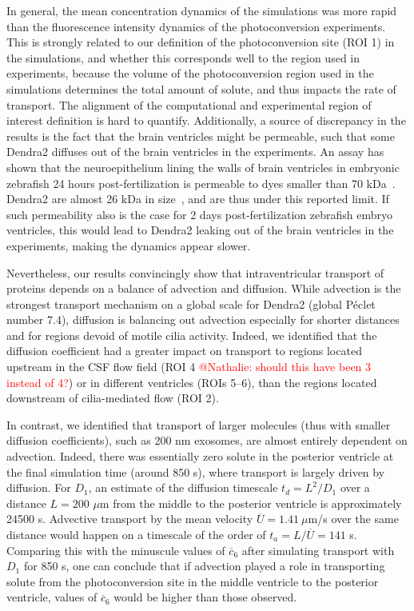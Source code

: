 \documentclass[fleqn]{wlscirep}
\newcommand{\cbar}{\overline{c}}
\newcommand{\fixme}[1]{\textcolor{red}{#1}}
\begin{document}
In general, the mean concentration dynamics of the simulations was 
more rapid than the fluorescence intensity dynamics of the photoconversion experiments.
This is strongly related to our definition of the photoconversion site
(ROI 1) in the simulations, and whether this corresponds well to the
region used in experiments, because the volume of the photoconversion
region used in the simulations determines the total amount of solute,
and thus impacts the rate of transport. The alignment of the computational
and experimental region of interest definition is hard to quantify.
Additionally, a source of discrepancy in the results is the fact that the
brain ventricles might be permeable, such that some Dendra2 diffuses out
of the brain ventricles in the experiments. An assay has shown that the neuroepithelium
lining the walls of brain ventricles in embryonic zebrafish 24 hours post-fertilization
is permeable to dyes smaller than 70 kDa~\cite{Chang2012AnNeuroepithelium}.
Dendra2 are almost 26 kDa in size~\cite{Gurskaya2006EngineeringLight},
and are thus under this reported limit. If such permeability also is the case for 2 days
post-fertilization zebrafish embryo ventricles, this would lead to Dendra2 leaking
out of the brain ventricles in the experiments, making the dynamics appear slower. 

Nevertheless, our results convincingly show that intraventricular transport of proteins
depends on a balance of advection and diffusion. While advection is the strongest transport
mechanism on a global scale for Dendra2 (global Péclet number 7.4), diffusion is balancing out
advection especially for shorter distances and for regions devoid of motile cilia activity.
Indeed, we identified that the diffusion coefficient had a greater impact on transport to
regions located upstream in the CSF flow field (ROI 4 \fixme{@Nathalie: should this have been 3 instead of 4?}) or in different ventricles (ROIs 5--6),
than the regions located downstream of cilia-mediated flow (ROI 2).

In contrast, we identified that transport of larger molecules
(thus with smaller diffusion coefficients),
such as 200 nm exosomes, are almost entirely dependent on advection.
Indeed, there was essentially zero solute in the posterior ventricle at the
final simulation time (around 850 s), where transport is largely driven by diffusion.
For $D_1$, an estimate of the diffusion timescale $t_d=L^2/D_1$ over a distance
$L=200$ $\mu$m from the middle to the posterior ventricle is approximately 24500 s.
Advective transport by the mean velocity $\overline{U}=1.41 \ \mu$m/s over the same distance would happen
on a timescale of the order of $t_a=L/\overline{U}=141$ s. Comparing this with the minuscule values of
$\cbar_6$ after simulating transport with $D_1$ for 850 s, one can conclude that if advection
played a role in transporting solute from the photoconversion site in the middle ventricle
to the posterior ventricle, values of $\cbar_6$ would be higher than those observed.
\end{document}
